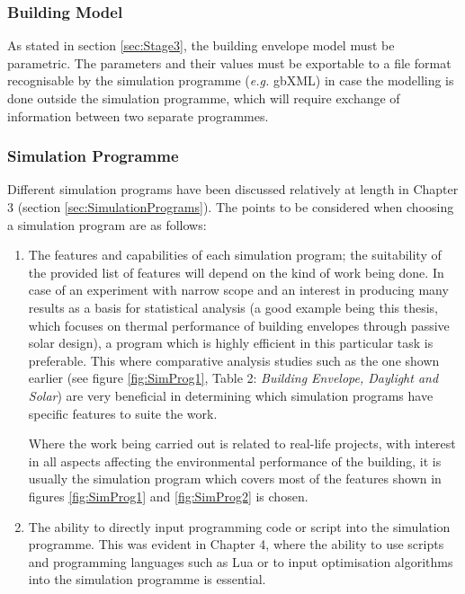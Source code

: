 \subsubsection{Building Model}

As stated in section \ref{sec:Stage3}, the building envelope model must be parametric. The parameters and their values must be exportable to a file format recognisable by the simulation programme (\emph{e.g.} gbXML) in case the modelling is done outside the simulation programme, which will require exchange of information between two separate programmes.

\subsubsection{Simulation Programme}
Different simulation programs have been discussed relatively at length in Chapter 3 (section \ref{sec:SimulationPrograms}). The points to be considered when choosing a simulation program are as follows:

\begin{enumerate}
	\item The features and capabilities of each simulation program; the suitability of the provided list of features will depend on the kind of work being done. In case of an experiment with narrow scope and an interest in producing many results as a basis for statistical analysis (a good example being this thesis, which focuses on thermal performance of building envelopes through passive solar design), a program which is highly efficient in this particular task is preferable. This where comparative analysis studies such as the one shown earlier (see figure \ref{fig:SimProg1}, Table 2: \emph{Building Envelope, Daylight and Solar}) are very beneficial in determining which simulation programs have specific features to suite the work.

		Where the work being carried out is related to real-life projects, with interest in all aspects affecting the environmental performance of the building, it is usually the simulation program which covers most of the features shown in figures \ref{fig:SimProg1} and \ref{fig:SimProg2} is chosen.
	
	\item The ability to directly input programming code or script into the simulation programme. This was evident in Chapter 4, where the ability to use scripts and programming languages such as Lua or to input optimisation algorithms into the simulation programme is essential.
\end{enumerate}


